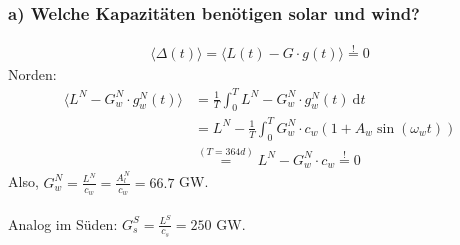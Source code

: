 \documentclass[11pt,a4paper,fleqn]{scrartcl}
\begin{document}
\begin{enumerate}[(a)]
 \subsubsection*{a) Welche Kapazitäten ben\"otigen solar und wind?}
 \begin{align*}
       \langle \Delta (t) \rangle = \langle L(t) - G \cdot g(t) \rangle \overset{!}{=} 0
 \end{align*}
 Norden:
 \begin{align*}
       \langle L^N - G^N_w\cdot g_w^N(t)\rangle &=\frac{1}{T} \int_0^T L^N - G_w^N \cdot g_w^N(t) \ \mathrm{d}t \\
       &=L^N - \frac{1}{T} \int_0^T G_w^N\cdot c_w \left(1+A_w\sin{\left(\omega_wt\right)}\right)\\
       &\overset{(T=364d)}{=} L^N - G_w^N \cdot c_w \overset{!}{=} 0
 \end{align*}
 Also, $G_w^N = \frac{L^N}{c_w} = \frac{A_l^N}{c_w} = 66.7$ GW.\\
 \ \\
 Analog im S\"uden: $G_s^S = \frac{L^S}{c_s} = 250$ GW.
 

\end{enumerate}
\end{document}
